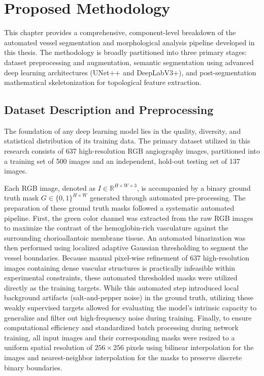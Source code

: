 \chapter{Proposed Methodology}
\label{ch:methodology}

This chapter provides a comprehensive, component-level breakdown of the automated vessel segmentation and morphological analysis pipeline developed in this thesis. The methodology is broadly partitioned into three primary stages: dataset preprocessing and augmentation, semantic segmentation using advanced deep learning architectures (UNet++ and DeepLabV3+), and post-segmentation mathematical skeletonization for topological feature extraction.

\section{Dataset Description and Preprocessing}
The foundation of any deep learning model lies in the quality, diversity, and statistical distribution of its training data. The primary dataset utilized in this research consists of 637 high-resolution RGB angiography images, partitioned into a training set of 500 images and an independent, hold-out testing set of 137 images. 

Each RGB image, denoted as $I \in \mathbb{R}^{H \times W \times 3}$, is accompanied by a binary ground truth mask $G \in \{0,1\}^{H \times W}$ generated through automated pre-processing. The preparation of these ground truth masks followed a systematic automated pipeline. First, the green color channel was extracted from the raw RGB images to maximize the contrast of the hemoglobin-rich vasculature against the surrounding chorioallantoic membrane tissue. An automated binarization was then performed using localized adaptive Gaussian thresholding to segment the vessel boundaries. Because manual pixel-wise refinement of 637 high-resolution images containing dense vascular structures is practically infeasible within experimental constraints, these automated thresholded masks were utilized directly as the training targets. While this automated step introduced local background artifacts (salt-and-pepper noise) in the ground truth, utilizing these weakly supervised targets allowed for evaluating the model's intrinsic capacity to generalize and filter out high-frequency noise during training. Finally, to ensure computational efficiency and standardized batch processing during network training, all input images and their corresponding masks were resized to a uniform spatial resolution of $256 \times 256$ pixels using bilinear interpolation for the images and nearest-neighbor interpolation for the masks to preserve discrete binary boundaries.

